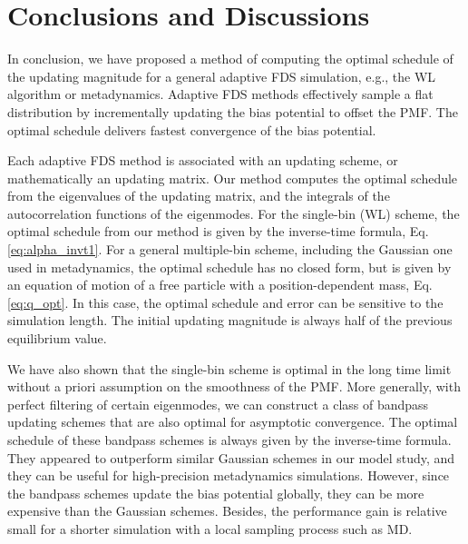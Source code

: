 \documentclass[reprint, floatfix]{revtex4-1}
\begin{document}
\section{\label{sec:conclusion}
Conclusions and Discussions}



In conclusion,
we have proposed a method of computing
the optimal schedule of the updating magnitude
for a general adaptive FDS simulation,
e.g., the WL algorithm or metadynamics.
%
Adaptive FDS methods
effectively sample a flat distribution
by incrementally updating the bias potential
to offset the PMF.
%
The optimal schedule delivers fastest convergence
of the bias potential.



Each adaptive FDS method is associated with
an updating scheme,
or mathematically an updating matrix.
%
Our method computes the optimal schedule from
the eigenvalues of the updating matrix,
and the integrals of the autocorrelation functions
of the eigenmodes.
%
For the single-bin (WL) scheme,
the optimal schedule from our method
is given by the inverse-time formula,
Eq. \eqref{eq:alpha_invt1}.
%
For a general multiple-bin scheme,
including the Gaussian one used in metadynamics,
the optimal schedule has no closed form,
but is given by an equation of motion
of a free particle with a position-dependent mass, Eq. \eqref{eq:q_opt}.
%
In this case,
the optimal schedule and error
can be sensitive to the simulation length.
%
The initial updating magnitude is always
half of the previous equilibrium value.

We have also shown that
the single-bin scheme is optimal
in the long time limit
without a priori assumption
on the smoothness of the PMF.
%
More generally, with perfect filtering
of certain eigenmodes, we can construct a
class of bandpass updating schemes
that are also optimal for asymptotic convergence.
%
The optimal schedule of these bandpass schemes
is always given by the inverse-time formula.
%
They appeared to outperform similar Gaussian schemes
in our model study,
and they can be useful
for high-precision metadynamics simulations.
%
However, since the bandpass schemes
update the bias potential globally,
they can be more expensive than
the Gaussian schemes.
%
Besides, the performance gain
is relative small for a shorter simulation
with a local sampling process such as MD.
\end{document}
